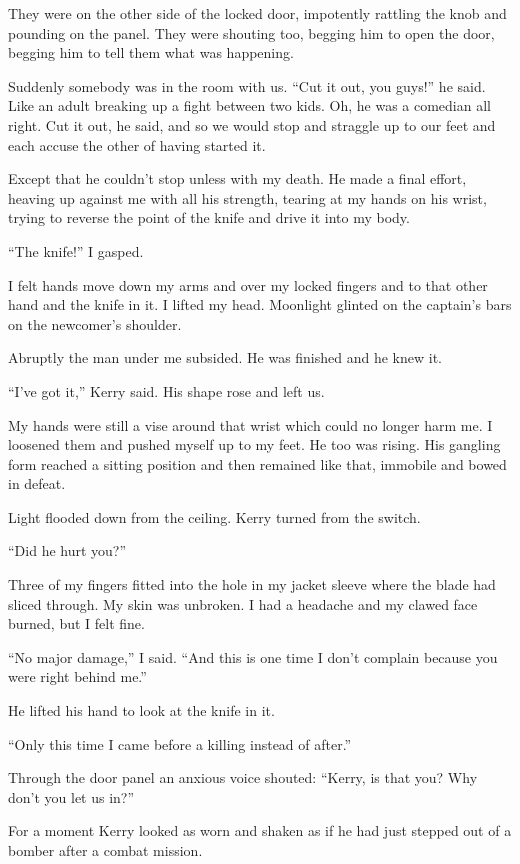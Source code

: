 \documentclass{novel}
\begin{document}
\scenestars

They were on the other side of the locked door, impotently rattling the knob and pounding on the panel. They were shouting too, begging him to open the door, begging him to tell them what was happening.

Suddenly somebody was in the room with us. “Cut it out, you guys!” he said. Like an adult breaking up a fight between two kids. Oh, he was a comedian all right. Cut it out, he said, and so we would stop and straggle up to our feet and each accuse the other of having started it.

Except that he couldn’t stop unless with my death. He made a final effort, heaving up against me with all his strength, tearing at my hands on his wrist, trying to reverse the point of the knife and drive it into my body. 

“The knife!” I gasped.

I felt hands move down my arms and over my locked fingers and to that other hand and the knife in it. I lifted my head. Moonlight glinted on the captain’s bars on the newcomer’s shoulder.

Abruptly the man under me subsided. He was finished and he knew it.

“I’ve got it,” Kerry said. His shape rose and left us.

My hands were still a vise around that wrist which could no longer harm me. I loosened them and pushed myself up to my feet. He too was rising. His gangling form reached a sitting position and then remained like that, immobile and bowed in defeat.

Light flooded down from the ceiling. Kerry turned from the switch.

“Did he hurt you?”

Three of my fingers fitted into the hole in my jacket sleeve where the blade had sliced through. My skin was unbroken. I had a headache and my clawed face burned, but I felt fine.

“No major damage,” I said. “And this is one time I don’t complain because you were right behind me.”

He lifted his hand to look at the knife in it.

“Only this time I came before a killing instead of after.”

Through the door panel an anxious voice shouted: “Kerry, is that you? Why don’t you let us in?”

For a moment Kerry looked as worn and shaken as if he had just stepped out of a bomber after a combat mission.
\end{document}
